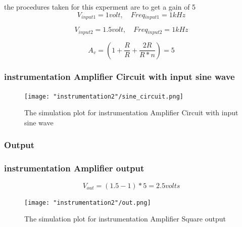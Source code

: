 \documentclass{article}
\begin{document}
	the procedures taken for this experment are to get a gain of 5
	\begin{equation}
	V{_{input1}} = 1 { volt}, \quad {Freq}{_{input1}} = 1 {kHz}
	\end{equation}
	
	\begin{equation}
	V{_{input2}} = 1.5 { volt}, \quad {Freq}{_{input2}} = 1 {kHz}
	\end{equation}
	
	\begin{equation}
	A_{v} = \left(1 + \frac{R}{R} + \frac{2 R}{R * n}\right) = 5
	\end{equation}
	
	\subsubsection{instrumentation Amplifier Circuit with input sine wave}
	\begin{figure}[H]
		\centering
		\texttt{[image: "instrumentation2"/sine\_circuit.png]}
		\caption{The simulation plot for instrumentation Amplifier Circuit with input sine wave}
		\label{fig:ins2_circuit}
	\end{figure}
	
	\subsubsection{Output}
	
	\subsubsection{instrumentation Amplifier output}
	\begin{equation}
		V{_{out}} = (1.5 - 1)  * 5 = 2.5 {volts}
	\end{equation}
	\begin{figure}[H]
		\centering
		\texttt{[image: "instrumentation2"/out.png]}
		\caption{The simulation plot for instrumentation Amplifier Square output}
		\label{fig:out2}
	\end{figure}


	
	


	
	
	
	
\end{document}
